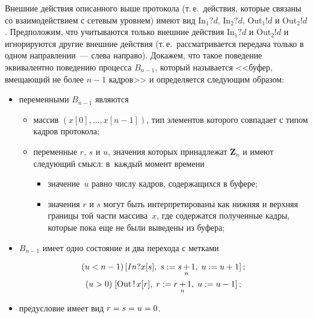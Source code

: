 \begin{multicols}{2}
Внешние действия описанного выше протокола (т.\,е.\ действия, которые
связаны со взаимодействием с сетевым уровнем) имеют вид In$_1?d$,
In$_2?d$, Out$_1!d$ и Out$_2!d$. Предположим, что учитываются
только внешние действия In$_1?d$ и Out$_2!d$ и игнорируются
другие внешние действия (т.\,е.\ рассматривается передача только в
одном направлении~--- слева направо). Докажем, что такое поведение
эквивалентно поведению процесса $B_{n-1}$, который называется
<<буфер, вмещающий не более $n-1$ кадров>> и определяется следующим
образом:
\begin{itemize}
\item переменными $B_{n-1}$ являются\\[-14pt]
\begin{itemize}
\item массив
$(x[0],\ldots, x[n-1])$, тип элементов которого совпадает с типом
кадров протокола;\\[-14pt]
\item переменные $r$, $s$ и $u$, значения которых
принадлежат ${\mathbf Z}_n$ и имеют следующий смысл: в~каж\-дый момент времени\\[-14pt]
\begin{itemize}
\item  значение~$u$ равно числу кадров, содержащихся в
буфере;\\[-14pt]
\item  значения  $r$ и $s$ могут быть интерпретированы как
нижняя и верхняя границы той части массива~$x$, где содержатся
полученные кадры, которые пока еще не были выведены из буфера;\\[-14pt]
\end{itemize}
\end{itemize}
\item $B_{n-1}$ имеет одно состояние и два перехода с метками

\noindent
   \begin{gather*}
   (u<n-1)\,[In?x[s],\;s:=s\mathop{+}\limits_{n}1,\;u:=u+1]\,;\\
   (u>0)\;[\mathrm{Out}\,!\,x[r],\;r:=r\mathop{+}\limits_{n}1,\;u:=u-1]\,;
\end{gather*}

\vspace*{-6pt}

\item  предусловие имеет вид $r \hm= s \hm= u \hm= 0$.
\end{itemize}

\vspace*{-6pt}


\end{multicols}
